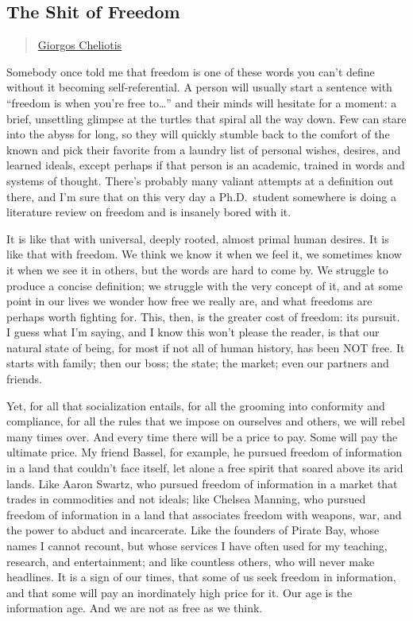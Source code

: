 \subsection{The Shit of Freedom}\label{the-shit-of-freedom}

\begin{quote}
\href{../appendix/attributions.html\#giorgos-cheliotis}{Giorgos
Cheliotis}
\end{quote}

Somebody once told me that freedom is one of these words you can't
define without it becoming self-referential. A person will usually start
a sentence with ``freedom is when you're free to\ldots{}'' and their
minds will hesitate for a moment: a brief, unsettling glimpse at the
turtles that spiral all the way down. Few can stare into the abyss for
long, so they will quickly stumble back to the comfort of the known and
pick their favorite from a laundry list of personal wishes, desires, and
learned ideals, except perhaps if that person is an academic, trained in
words and systems of thought. There's probably many valiant attempts at
a definition out there, and I'm sure that on this very day a
Ph.D.~student somewhere is doing a literature review on freedom and is
insanely bored with it.

It is like that with universal, deeply rooted, almost primal human
desires. It is like that with freedom. We think we know it when we feel
it, we sometimes know it when we see it in others, but the words are
hard to come by. We struggle to produce a concise definition; we
struggle with the very concept of it, and at some point in our lives we
wonder how free we really are, and what freedoms are perhaps worth
fighting for. This, then, is the greater cost of freedom: its pursuit. I
guess what I'm saying, and I know this won't please the reader, is that
our natural state of being, for most if not all of human history, has
been NOT free. It starts with family; then our boss; the state; the
market; even our partners and friends.

Yet, for all that socialization entails, for all the grooming into
conformity and compliance, for all the rules that we impose on ourselves
and others, we will rebel many times over. And every time there will be
a price to pay. Some will pay the ultimate price. My friend Bassel, for
example, he pursued freedom of information in a land that couldn't face
itself, let alone a free spirit that soared above its arid lands. Like
Aaron Swartz, who pursued freedom of information in a market that trades
in commodities and not ideals; like Chelsea Manning, who pursued freedom
of information in a land that associates freedom with weapons, war, and
the power to abduct and incarcerate. Like the founders of Pirate Bay,
whose names I cannot recount, but whose services I have often used for
my teaching, research, and entertainment; and like countless others, who
will never make headlines. It is a sign of our times, that some of us
seek freedom in information, and that some will pay an inordinately high
price for it. Our age is the information age. And we are not as free as
we think.

